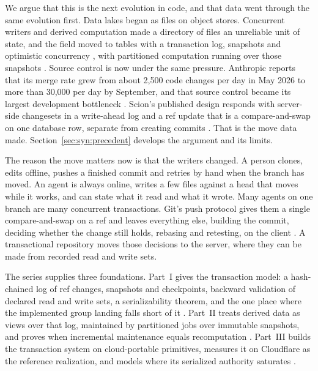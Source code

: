 \documentclass[11pt,letterpaper]{article}
\theoremstyle{definition}
\theoremstyle{remark}
\begin{document}
We argue that this is the next evolution in code, and that data went through the same evolution first. Data lakes began as files on object stores. Concurrent writers and derived computation made a directory of files an unreliable unit of state, and the field moved to tables with a transaction log, snapshots and optimistic concurrency \cite{armbrust2020delta,icebergspec}, with partitioned computation running over those snapshots \cite{zaharia2012rdd}. Source control is now under the same pressure. Anthropic reports that its merge rate grew from about 2,500 code changes per day in May 2026 to more than 30,000 per day by September, and that source control became its largest development bottleneck \cite{anthropic2026scion}. %
Scion's published design responds with server-side changesets in a write-ahead log and a ref update that is a compare-and-swap on one database row, separate from creating commits \cite{anthropic2026scion}. That is the move data made. Section~\ref{sec:syn:precedent} develops the argument and its limits.

The reason the move matters now is that the writers changed. A person clones, edits offline, pushes a finished commit and retries by hand when the branch has moved. An agent is always online, writes a few files against a head that moves while it works, and can state what it read and what it wrote. Many agents on one branch are many concurrent transactions. Git's push protocol gives them a single compare-and-swap on a ref and leaves everything else, building the commit, deciding whether the change still holds, rebasing and retesting, on the client \cite{gitprotocol}. A transactional repository moves those decisions to the server, where they can be made from recorded read and write sets.

The series supplies three foundations. Part~I gives the transaction model: a hash-chained log of ref changes, snapshots and checkpoints, backward validation of declared read and write sets, a serializability theorem, and the one place where the implemented group landing falls short of it \cite{long2026partI}. Part~II treats derived data as views over that log, maintained by partitioned jobs over immutable snapshots, and proves when incremental maintenance equals recomputation \cite{long2026partII}. Part~III builds the transaction system on cloud-portable primitives, measures it on Cloudflare as the reference realization, and models where its serialized authority saturates \cite{long2026partIII}.
\end{document}

